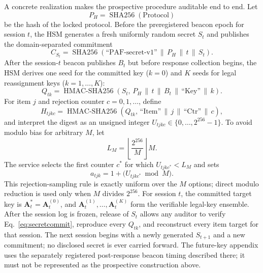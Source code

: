 \documentclass[11pt,letterpaper]{article}
\begin{document}
A concrete realization makes the prospective procedure auditable end to end. Let
\begin{equation}
P_H=\operatorname{SHA256}(\text{Protocol})
\end{equation}
be the hash of the locked protocol. Before the preregistered beacon epoch for session $t$, the HSM generates a fresh uniformly random secret $S_t$ and publishes the domain-separated commitment
\begin{equation}
C_{S_t}=\operatorname{SHA256}\!\left(\text{``PAF-secret-v1''}\,\|\,P_H\,\|\,t\,\|\,S_t\right).
\label{eq:secretcommit}
\end{equation}
After the session-$t$ beacon publishes $B_t$ but before response collection begins, the HSM derives one seed for the committed key ($k=0$) and $K$ seeds for legal reassignment keys ($k=1,\ldots,K$):
\begin{equation}
Q_{tk}=\operatorname{HMAC\text{-}SHA256}\!\left(S_t,\,P_H\,\|\,t\,\|\,B_t\,\|\,\text{``Key''}\,\|\,k\right).
\label{eq:keyseed}
\end{equation}
For item $j$ and rejection counter $c=0,1,\ldots$, define
\begin{equation}
H_{tjkc}=\operatorname{HMAC\text{-}SHA256}\!\left(Q_{tk},\,\text{``Item''}\,\|\,j\,\|\,\text{``Ctr''}\,\|\,c\right),
\end{equation}
and interpret the digest as an unsigned integer $U_{tjkc}\in\{0,\ldots,2^{256}-1\}$. To avoid modulo bias for arbitrary $M$, let
\begin{equation}
L_M=\left\lfloor\frac{2^{256}}{M}\right\rfloor M.
\end{equation}
The service selects the first counter $c^*$ for which $U_{tjkc^*}<L_M$ and sets
\begin{equation}
a_{tjk}=1+\big(U_{tjkc^*}\bmod M\big).
\label{eq:targetindex}
\end{equation}
This rejection-sampling rule is exactly uniform over the $M$ options; direct modulo reduction is used only when $M$ divides $2^{256}$. For session $t$, the committed target key is $\mathbf{A}^{*}_t=\mathbf{A}^{(0)}_t$, and $\mathbf{A}^{(1)}_t,\ldots,\mathbf{A}^{(K)}_t$ form the verifiable legal-key ensemble. After the session log is frozen, release of $S_t$ allows any auditor to verify Eq.~\ref{eq:secretcommit}, reproduce every $Q_{tk}$, and reconstruct every item target for that session. The next session begins with a newly generated $S_{t+1}$ and a new commitment; no disclosed secret is ever carried forward. The future-key appendix uses the separately registered post-response beacon timing described there; it must not be represented as the prospective construction above.
\end{document}
